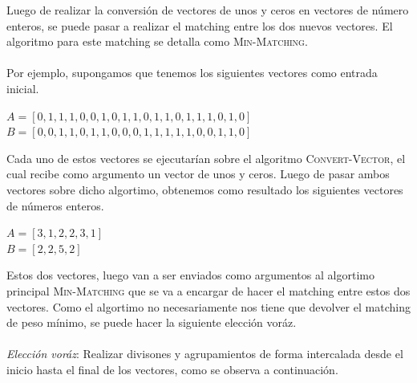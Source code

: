 \documentclass[conference]{IEEEtran}
\begin{document}
Luego de realizar la conversión de vectores de unos y ceros en vectores de número enteros, se puede pasar a realizar el matching entre los dos nuevos vectores. El algoritmo para este matching se detalla como \textsc{Min-Matching}.\\\\
Por ejemplo, supongamos que tenemos los siguientes vectores como entrada inicial.
\begin{center}
    $A=[0,1,1,1,0,0,1,0,1,1,0,1,1,0,1,1,1,0,1,0]$\\
    $B=[0,0,1,1,0,1,1,0,0,0,1,1,1,1,1,0,0,1,1,0]$
\end{center}
Cada uno de estos vectores se ejecutarían sobre el algoritmo \textsc{Convert-Vector}, el cual recibe como argumento un vector de unos y ceros. Luego de pasar ambos vectores sobre dicho algortimo, obtenemos como resultado los siguientes vectores de números enteros.
\begin{center}
    $A=[3,1,2,2,3,1]$\\
    $B=[2,2,5,2]$
\end{center}
Estos dos vectores, luego van a ser enviados como argumentos al algortimo principal \textsc{Min-Matching} que se va a encargar de hacer el matching entre estos dos vectores. Como el algortimo no necesariamente nos tiene que devolver el matching de peso mínimo, se puede hacer la siguiente elección voráz.\\\\
\textit{Elección voráz}: Realizar divisones y agrupamientos de forma intercalada desde el inicio hasta el final de los vectores, como se observa a continuación.\\
\begin{center}
\end{center}
\end{document}
